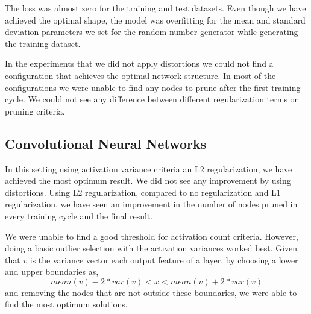The loss was almost zero for the training and test datasets. Even though we have achieved the optimal shape, the model was overfitting for the mean and standard deviation parameters we set for the random number generator while generating the training dataset.

In the experiments that we did not apply distortions we could not find a configuration that achieves the optimal network structure. In most of the configurations we were unable to find any nodes to prune after the first training cycle. We could not see any difference between different regularization terms or pruning criteria.

\subsection{Convolutional Neural Networks}
In this setting using activation variance criteria an L2 regularization, we have achieved the most optimum result. We did not see any improvement by using distortions. Using L2 regularization, compared to no regularization and L1 regularization, we have seen an improvement in the number of nodes pruned in every training cycle and the final result. 

We were unable to find a good threshold for activation count criteria. However, doing a basic outlier selection with the activation variances worked best. Given that $v$ is the variance vector each output feature of a layer, by choosing a lower and upper boundaries as,
$$ mean(v) - 2*var(v) < x < mean(v) + 2*var(v) $$
and removing the nodes that are not outside these boundaries, we were able to find the most optimum solutions. 

